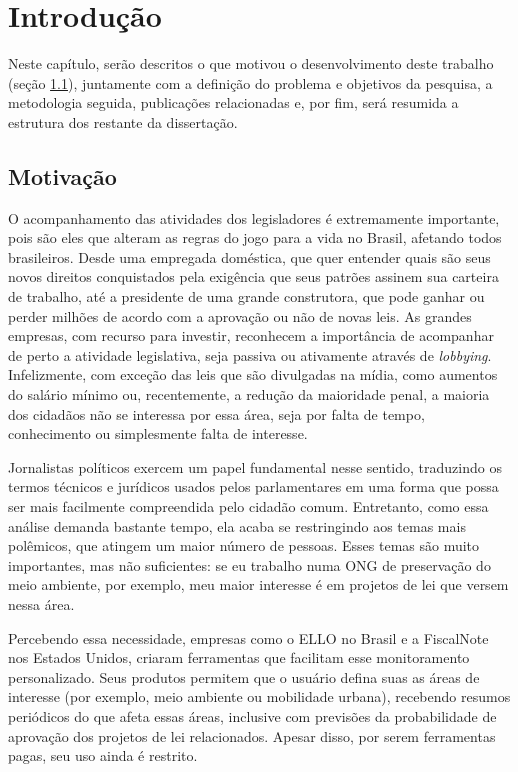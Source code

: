 \chapter{Introdução} \label{intro}

Neste capítulo, serão descritos o que motivou o desenvolvimento deste trabalho
(seção \ref{sec:motivacao}), juntamente com a definição do problema e objetivos
da pesquisa, a metodologia seguida, publicações relacionadas e, por fim, será
resumida a estrutura dos restante da dissertação.

\section{Motivação}\label{sec:motivacao}

O acompanhamento das atividades dos legisladores é extremamente importante,
pois são eles que alteram as regras do jogo para a vida no Brasil, afetando
todos brasileiros. Desde uma empregada doméstica, que quer entender quais são
seus novos direitos conquistados pela exigência que seus patrões assinem sua
carteira de trabalho, até a presidente de uma grande construtora, que pode
ganhar ou perder milhões de acordo com a aprovação ou não de novas leis. As grandes
empresas, com recurso para investir, reconhecem a importância de acompanhar de
perto a atividade legislativa, seja passiva ou ativamente através de
\emph{lobbying}. Infelizmente, com exceção das leis que são divulgadas na mídia,
como aumentos do salário mínimo ou, recentemente, a redução da maioridade
penal, a maioria dos cidadãos não se interessa por essa área, seja por falta de
tempo, conhecimento ou simplesmente falta de interesse.

Jornalistas políticos exercem um papel fundamental nesse sentido, traduzindo os
termos técnicos e jurídicos usados pelos parlamentares em uma forma que possa
ser mais facilmente compreendida pelo cidadão comum. Entretanto, como essa
análise demanda bastante tempo, ela acaba se restringindo aos temas mais
polêmicos, que atingem um maior número de pessoas. Esses temas são muito
importantes, mas não suficientes: se eu trabalho numa ONG de preservação do
meio ambiente, por exemplo, meu maior interesse é em projetos de lei que versem
nessa área.

Percebendo essa necessidade, empresas como o \gls{ELLO} no Brasil e a
FiscalNote nos Estados Unidos, criaram ferramentas que facilitam esse
monitoramento personalizado. Seus produtos permitem que o usuário defina suas
as áreas de interesse (por exemplo, meio ambiente ou mobilidade urbana),
recebendo resumos periódicos do que afeta essas áreas, inclusive com previsões
da probabilidade de aprovação dos projetos de lei relacionados. Apesar disso,
por serem ferramentas pagas, seu uso ainda é restrito.

